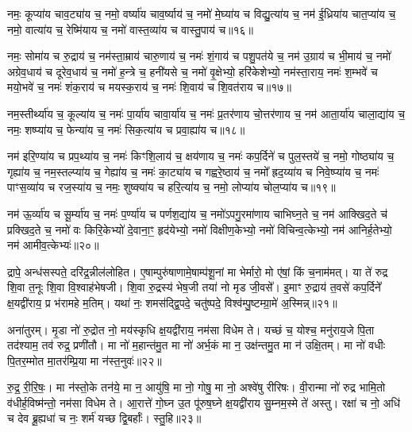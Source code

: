 नमः॒ कूप्या॑य चाव॒ट्या॑य च॒ नमो॒ वर्ष्या॑य चाव॒र्ष्याय॑ च॒ नमो॑ मे॒घ्या॑य च विद्यु॒त्या॑य च॒ नम॑ ई॒ध्रिया॑य चात॒प्या॑य च॒ नमो॒ वात्या॑य च॒ रेष्मि॑याय च॒ नमो॑ वास्त॒व्या॑य च वास्तु॒पाय॑ च॥१६॥

{\anuvakamend[{वै॒श॒न्ताय॑ च त्रि॒ꣳ॒शच्च॑॥७॥}]}

नमः॒ सोमा॑य च रु॒द्राय॑ च॒ नम॑स्ता॒म्राय॑ चारु॒णाय॑ च॒ नमः॑ शं॒गाय॑ च पशु॒पत॑ये च॒ नम॑ उ॒ग्राय॑ च भी॒माय॑ च॒ नमो॑ अग्रेव॒धाय॑ च दूरेव॒धाय॑ च॒ नमो॑ ह॒न्त्रे च॒ हनी॑यसे च॒ नमो॑ वृ॒क्षेभ्यो॒ हरि॑केशेभ्यो॒ नम॑स्ता॒राय॒ नमः॑ श॒म्भवे॑ च मयो॒भवे॑ च॒ नमः॑ शंक॒राय॑ च मयस्क॒राय॑ च॒ नमः॑ शि॒वाय॑ च शि॒वत॑राय च॥१७॥

नम॒स्तीर्थ्या॑य च॒ कूल्या॑य च॒ नमः॑ पा॒र्या॑य चावा॒र्या॑य च॒ नमः॑ प्र॒तर॑णाय चो॒त्तर॑णाय च॒ नम॑ आता॒र्या॑य चाला॒द्या॑य च॒ नमः॒ शष्प्या॑य च॒ फेन्या॑य च॒ नमः॑ सिक॒त्या॑य च प्रवा॒ह्या॑य च॥१८॥

{\anuvakamend[{शि॒वत॑राय च त्रि॒ꣳ॒शच्च॑॥८॥}]}

नम॑ इरि॒ण्या॑य च प्रप॒थ्या॑य च॒ नमः॑ किꣳशि॒लाय॑ च॒ क्षय॑णाय च॒ नमः॑ कप॒र्दिने॑ च पुल॒स्तये॑ च॒ नमो॒ गोष्ठ्या॑य च॒ गृह्या॑य च॒ नम॒स्तल्प्या॑य च॒ गेह्या॑य च॒ नमः॑ का॒ट्या॑य च गह्वरे॒ष्ठाय॑ च॒ नमो᳚ ह्रद॒य्या॑य च निवे॒ष्प्या॑य च॒ नमः॑ पाꣳस॒व्या॑य च रज॒स्या॑य च॒ नमः॒ शुष्क्या॑य च हरि॒त्या॑य च॒ नमो॒ लोप्या॑य चोल॒प्या॑य च॥१९॥

नम॑ ऊ॒र्व्या॑य च सू॒र्म्या॑य च॒ नमः॑ प॒र्ण्या॑य च पर्णश॒द्या॑य च॒ नमो॑\-ऽपगु॒रमा॑णाय चाभिघ्न॒ते च॒ नम॑ आक्खिद॒ते च॑ प्रक्खिद॒ते च॒ नमो॑ वः किरि॒केभ्यो॑ दे॒वाना॒ꣳ॒ हृद॑येभ्यो॒ नमो॑ विक्षीण॒केभ्यो॒ नमो॑ विचिन्व॒त्केभ्यो॒ नम॑ आनिर्\mbox{}ह॒तेभ्यो॒ नम॑ आमीव॒त्केभ्यः॑॥२०॥

{\anuvakamend[{उ॒ल॒प्या॑य च॒ त्रय॑स्त्रिꣳशच्च॥९॥}]}

द्रापे॒ अन्ध॑सस्पते॒ दरि॑द्र॒न्नील॑लोहित। ए॒षाम्पुरु॑षाणामे॒षाम्प॑शू॒नां मा भेर्मारो॒ मो ए॑षां॒ किं च॒नाम॑मत्। या ते॑ रुद्र शि॒वा त॒नूः शि॒वा वि॒श्वाह॑भेषजी। शि॒वा रु॒द्रस्य॑ भेष॒जी तया॑ नो मृड जी॒वसे᳚। इ॒माꣳ रु॒द्राय॑ त॒वसे॑ कप॒र्दिने᳚ क्ष॒यद्वी॑राय॒ प्र भ॑रामहे म॒तिम्। यथा॑ नः॒ शमस॑द्द्वि॒पदे॒ चतु॑ष्पदे॒ विश्व॑म्पु॒ष्टम्ग्रा॒मे॑ अ॒स्मिन्न्॥२१॥

अना॑तुरम्। मृ॒डा नो॑ रु॒द्रोत नो॒ मय॑स्कृधि क्ष॒यद्वी॑राय॒ नम॑सा विधेम ते। यच्छं च॒ योश्च॒ मनु॑राय॒जे पि॒ता तद॑श्याम॒ तव॑ रुद्र॒ प्रणी॑तौ। मा नो॑ म॒हान्त॑मु॒त मा नो॑ अर्भ॒कं मा न॒ उक्ष॑न्तमु॒त मा न॑ उक्षि॒तम्। मा नो॑ वधीः पि॒तर॒म्मोत मा॒तर॑म्प्रि॒या मा न॑स्त॒नुवः॑॥२२॥

रु॒द्र॒ री॒रि॒षः॒। मा न॑स्तो॒के तन॑ये॒ मा न॒ आयु॑षि॒ मा नो॒ गोषु॒ मा नो॒ अश्वे॑षु रीरिषः। वी॒रान्मा नो॑ रुद्र भामि॒तो व॑धीर्\mbox{}ह॒विष्म॑न्तो॒ नम॑सा विधेम ते। आ॒रात्ते॑ गो॒घ्न उ॒त पू॑रुष॒घ्ने क्ष॒यद्वी॑राय सु॒म्नम॒स्मे ते॑ अस्तु। रक्षा॑ च नो॒ अधि॑ च देव ब्रू॒ह्यधा॑ च नः॒ शर्म॑ यच्छ द्वि॒बर्\mbox{}हाः᳚। स्तु॒हि॥२३॥

